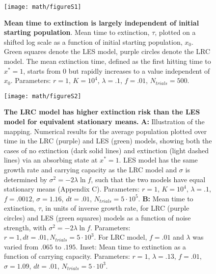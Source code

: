 \newpage

\renewcommand\thefigure{S1}    
\begin{figure}[h]
\centerline{
	\texttt{[image: math/figureS1]}}
	\caption{\textbf{Mean time to extinction is largely independent of initial starting population}.  Mean time to extinction, $\tau$, plotted on a shifted log scale as a function of initial starting population, $x_0$.  Green squares denote the LES model, purple circles denote the LRC model.  The mean extinction time, defined as the first hitting time to $x^* = 1$, starts from 0 but rapidly increases to a value independent of $x_0$.  Parameters:  $r = 1$, $K = 10^4$, $\lambda = .1$, $f = .01$, $N_{trials} = 500$.}
\end{figure}

\newpage
\renewcommand\thefigure{S2}    
\begin{figure}[h]
\centerline{
	\texttt{[image: math/figureS2]}}
	\caption{\textbf{The LRC model has higher extinction risk than the LES model for equivalent stationary means.} \textbf{A:} Illustration of the mapping.  Numerical results for the average population plotted over time in the LRC (purple) and LES (green) models, showing both the cases of no extinction (dark solid lines) and extinction (light dashed lines) via an absorbing state at $x^* = 1$.  LES model has the same growth rate and carrying capacity as the LRC model and $\sigma$ is determined by $\sigma^2 = -2\lambda\ln f$, such that the two models have equal stationary means (Appendix C).  Parameters:  $r = 1$, $K = 10^4$, $\lambda = .1$, $f = .0012$, $\sigma = 1.16$, $dt = .01$, $N_{trials} = 5\cdot 10^5$.  \textbf{B:}  Mean time to extinction, $\tau$, in units of inverse growth rate, for LRC (purple circles) and LES (green squares) models as a function of noise strength, with $\sigma^2 = -2\lambda\ln f$.   Parameters:  $r = 1, dt = .01, N_{trials} = 5\cdot 10^3$.  For LRC model, $f = .01$ and $\lambda$ was varied from $.065$ to $.195$.  Inset:  Mean time to extinction as a function of carrying capacity.  Parameters:  $r = 1$,  $\lambda = .13$, $f = .01$, $\sigma = 1.09$, $dt = .01$, $N_{trials} = 5\cdot 10^3$.}
\end{figure}




